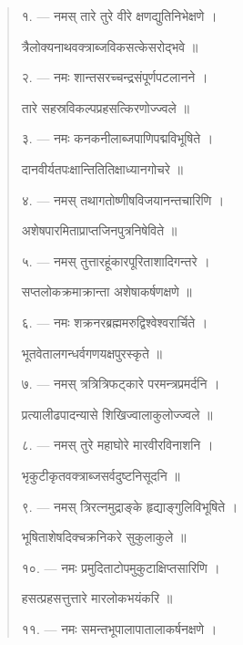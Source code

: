 \documentclass[a4paper, 11pt, oneside, french]{article}
\begin{document}
\begin{quotation}
\texthindi{१}. --- \texthindi{नमस् तारे तुरे वीरे क्षणद्युतिनिभेक्षणे ।}

\texthindi{त्रैलोक्यनाथवक्त्राब्जविकसत्केसरोद्भवे ॥}

\bigskip

\texthindi{२}. --- \texthindi{नमः शान्तसरच्चन्द्रसंपूर्णपटलानने ।}

\texthindi{तारे सहस्रविकल्पप्रहसत्किरणोज्ज्वले ॥}

\bigskip

\texthindi{३}. --- \texthindi{नमः कनकनीलाब्जपाणिपद्मविभूषिते ।}

\texthindi{दानवीर्यतपःक्षान्तितितिक्षाध्यानगोचरे ॥}

\bigskip

\texthindi{४}. --- \texthindi{नमस् तथागतोष्णीषविजयानन्तचारिणि ।}

\texthindi{अशेषपारमिताप्राप्तजिनपुत्रनिषेविते ॥}

\bigskip

\texthindi{५}. --- \texthindi{नमस् तुत्तारहूंकारपूरिताशादिगन्तरे ।}

\texthindi{सप्तलोकक्रमाक्रान्ता अशेषाकर्षणक्षणे ॥}

\bigskip

\texthindi{६}. --- \texthindi{नमः शक्रनरब्रह्ममरुद्विश्वेश्वरार्चिते ।}

\texthindi{भूतवेतालगन्धर्वगणयक्षपुरस्कृते ॥}

\bigskip

\texthindi{७}. --- \texthindi{नमस् त्रत्रित्रिफट्कारे परमन्त्रप्रमर्दनि ।}

\texthindi{प्रत्यालीढपादन्यासे शिखिज्वालाकुलोज्ज्वले ॥}

\bigskip

\texthindi{८}. --- \texthindi{नमस् तुरे महाघोरे मारवीरविनाशनि ।}

\texthindi{भृकुटीकृतवक्त्राब्जसर्वदुष्टनिसूदनि ॥}

\bigskip

\texthindi{९}. --- \texthindi{नमस् त्रिरत्नमुद्राङ्के हृद्याङ्गुलिविभूषिते ।}

\texthindi{भूषिताशेषदिक्चक्रनिकरे सुकुलाकुले ॥}

\bigskip

\texthindi{१०}. --- \texthindi{नमः प्रमुदिताटोपमुकुटाक्षिप्तसारिणि ।}

\texthindi{हसत्प्रहसत्तुत्तारे मारलोकभयंकरि ॥}

\bigskip

\texthindi{११}. --- \texthindi{नमः समन्तभूपालापातालाकर्षनक्षणे ।}


\end{quotation}
\end{document}
